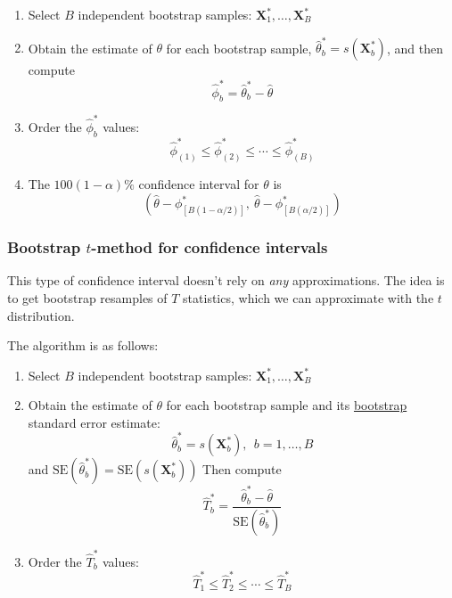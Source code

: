 \documentclass[12pt]{article}
\newcommand{\SE}{\text{SE}}
\numberwithin{equation}{section}
\begin{document}
\begin{enumerate}
  \item Select $B$ independent bootstrap samples:
  $\bm{X}_1^*, \ldots, \bm{X}_B^*$
  \item Obtain the estimate of $\theta$ for each bootstrap sample, $\hat{\theta}_b^* = s(\bm{X}_b^*)$, and then compute
  \begin{equation*}
    \hat{\phi}_b^* = \hat{\theta}_b^* - \hat{\theta}
  \end{equation*}
  \item Order the $\hat{\phi}_b^*$ values:
  \begin{equation*}
    \hat{\phi}_{(1)}^* \le \hat{\phi}_{(2)}^* \le \cdots 
      \le \hat{\phi}_{(B)}^*
  \end{equation*}
  \item The $100(1 - \alpha)\%$ confidence interval for $\theta$ is
  \begin{equation*}
    \left(
    \hat{\theta} - \phi^*_{[B(1 - \alpha / 2)]}, \ 
    \hat{\theta} - \phi^*_{[B(\alpha / 2)]}
    \right)
  \end{equation*}
\end{enumerate}


\subsubsection{Bootstrap $t$-method for confidence intervals}
This type of confidence interval doesn't rely on \textit{any} approximations. The idea is to get bootstrap resamples of $T$ statistics, which we can approximate with the $t$ distribution.

The algorithm is as follows:
\begin{enumerate}
  \item Select $B$ independent bootstrap samples:
  $\bm{X}_1^*, \ldots, \bm{X}_B^*$
  \item Obtain the estimate of $\theta$ for each bootstrap sample and its \underline{bootstrap} standard error estimate:
  \begin{equation*}
    \hat{\theta}_b^* = s(\bm{X}_b^*), \ \ b = 1, \ldots, B
  \end{equation*}
  and $\SE(\hat{\theta}_b^*) = \SE(s(\bm{X}_b^*))$ Then compute
  \begin{equation*}
    \hat{T}_b^* = \frac{\hat{\theta}_b^* - \hat{\theta}}{\SE(\hat{\theta}_b^*)}
  \end{equation*}
  \item Order the $\hat{T}_b^*$ values:
  \begin{equation*}
    \hat{T}^*_1 \le \hat{T}^*_2 \le \cdots \le \hat{T}^*_B
  \end{equation*}
\end{enumerate}
\end{document}
